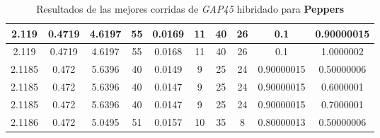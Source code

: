 \begin{table}[h!]
\begin{center}
\begin{tabular}{|c|c|c|c|c|c|c|c|c|c|}
        \hline
        \hline
            2.119 & 0.4719  & 4.6197 & 55 & 0.0169 & 11 & 40 & 26 & 0.1 & 0.90000015\\
        \hline
        \hline
            2.119 & 0.4719  & 4.6197 & 55 & 0.0168 & 11 & 40 & 26 & 0.1 & 1.0000002\\
        \hline
        \hline
            2.1185 & 0.472  & 5.6396 & 40 & 0.0149 & 9 & 25 & 24 & 0.90000015 & 0.50000006\\
        \hline
        \hline
            2.1185 & 0.472  & 5.6396 & 40 & 0.0147 & 9 & 25 & 24 & 0.90000015 & 0.6000001\\
        \hline
        \hline
            2.1185 & 0.472  & 5.6396 & 40 & 0.0147 & 9 & 25 & 24 & 0.90000015 & 0.7000001\\
        \hline
        \hline
            2.1186 & 0.472  & 5.0495 & 51 & 0.0157 & 10 & 35 & 8 & 0.80000013 & 0.50000006\\
        \hline
        \end{tabular}
        \caption{Resultados de las mejores corridas de \emph{GAP45} hibridado para {\bf Peppers}}
        \label{tb:tableGAP45}
    \end{center}
\end{table}
